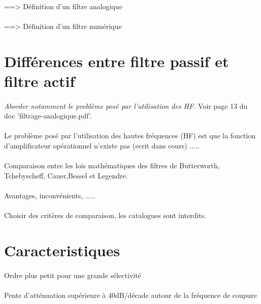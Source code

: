 \documentclass[a4paper,11pt]{article}
\begin{document}
    \paragraph{}
==> Définition d'un filtre analogique
    \paragraph{}
==> Définition d'un filtre numérique


\section{Différences entre filtre passif et filtre actif}
    \paragraph{}
\emph{Aborder notamment le problème posé par l'utilisation des HF.}
Voir page 13 du doc 'filtrage-analogique.pdf'.
    \paragraph{}
Le problème posé par l'utilisation des hautes fréquences (HF) est que la fonction d'amplificateur opérationnel n'existe pas (ecrit dans cours) .....
    \paragraph{}
Comparaison entre les lois mathématiques des filtres de Butterworth, Tchebyscheff, Cauer,Bessel et Legendre.
    \paragraph{}
Avantages, inconvénients, .....
    \paragraph{}
Choisir des critères de comparaison, les catalogues sont interdits.

    \clearpage

\section{Caracteristiques}
    \paragraph{}
Ordre plus petit pour une grande sélectivité
    \paragraph{}
Pente d’atténuation supérieure à 40dB/décade autour de la fréquence de coupure
\end{document}
